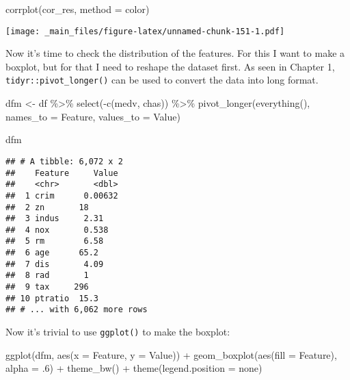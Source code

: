 \documentclass[
]{book}
\newenvironment{Shaded}{\begin{snugshade}}{\end{snugshade}}
\newcommand{\AttributeTok}[1]{\textcolor[rgb]{0.77,0.63,0.00}{#1}}
\newcommand{\DecValTok}[1]{\textcolor[rgb]{0.00,0.00,0.81}{#1}}
\newcommand{\FunctionTok}[1]{\textcolor[rgb]{0.00,0.00,0.00}{#1}}
\newcommand{\NormalTok}[1]{#1}
\newcommand{\OtherTok}[1]{\textcolor[rgb]{0.56,0.35,0.01}{#1}}
\newcommand{\SpecialCharTok}[1]{\textcolor[rgb]{0.00,0.00,0.00}{#1}}
\newcommand{\StringTok}[1]{\textcolor[rgb]{0.31,0.60,0.02}{#1}}
\begin{document}
\begin{Shaded}
\begin{Highlighting}[]
\FunctionTok{corrplot}\NormalTok{(cor\_res, }\AttributeTok{method =} \StringTok{\textquotesingle{}color\textquotesingle{}}\NormalTok{)}
\end{Highlighting}
\end{Shaded}

\texttt{[image: \_main\_files/figure-latex/unnamed-chunk-151-1.pdf]}

Now it's time to check the distribution of the features. For this I want to make a boxplot, but for that I need to reshape the dataset first. As seen in Chapter 1, \texttt{tidyr::pivot\_longer()} can be used to convert the data into long format.

\begin{Shaded}
\begin{Highlighting}[]
\NormalTok{dfm }\OtherTok{\textless{}{-}}\NormalTok{ df }\SpecialCharTok{\%\textgreater{}\%} \FunctionTok{select}\NormalTok{(}\SpecialCharTok{{-}}\FunctionTok{c}\NormalTok{(medv, chas)) }\SpecialCharTok{\%\textgreater{}\%}
  \FunctionTok{pivot\_longer}\NormalTok{(}\FunctionTok{everything}\NormalTok{(), }\AttributeTok{names\_to =} \StringTok{\textquotesingle{}Feature\textquotesingle{}}\NormalTok{, }\AttributeTok{values\_to =} \StringTok{\textquotesingle{}Value\textquotesingle{}}\NormalTok{)}

\NormalTok{dfm}
\end{Highlighting}
\end{Shaded}

\begin{verbatim}
## # A tibble: 6,072 x 2
##    Feature     Value
##    <chr>       <dbl>
##  1 crim      0.00632
##  2 zn       18      
##  3 indus     2.31   
##  4 nox       0.538  
##  5 rm        6.58   
##  6 age      65.2    
##  7 dis       4.09   
##  8 rad       1      
##  9 tax     296      
## 10 ptratio  15.3    
## # ... with 6,062 more rows
\end{verbatim}

Now it's trivial to use \texttt{ggplot()} to make the boxplot:

\begin{Shaded}
\begin{Highlighting}[]
\FunctionTok{ggplot}\NormalTok{(dfm, }\FunctionTok{aes}\NormalTok{(}\AttributeTok{x =}\NormalTok{ Feature, }\AttributeTok{y =}\NormalTok{ Value)) }\SpecialCharTok{+} 
  \FunctionTok{geom\_boxplot}\NormalTok{(}\FunctionTok{aes}\NormalTok{(}\AttributeTok{fill =}\NormalTok{ Feature), }\AttributeTok{alpha =}\NormalTok{ .}\DecValTok{6}\NormalTok{) }\SpecialCharTok{+} 
  \FunctionTok{theme\_bw}\NormalTok{() }\SpecialCharTok{+} \FunctionTok{theme}\NormalTok{(}\AttributeTok{legend.position =} \StringTok{\textquotesingle{}none\textquotesingle{}}\NormalTok{)}
\end{Highlighting}
\end{Shaded}
\end{document}
